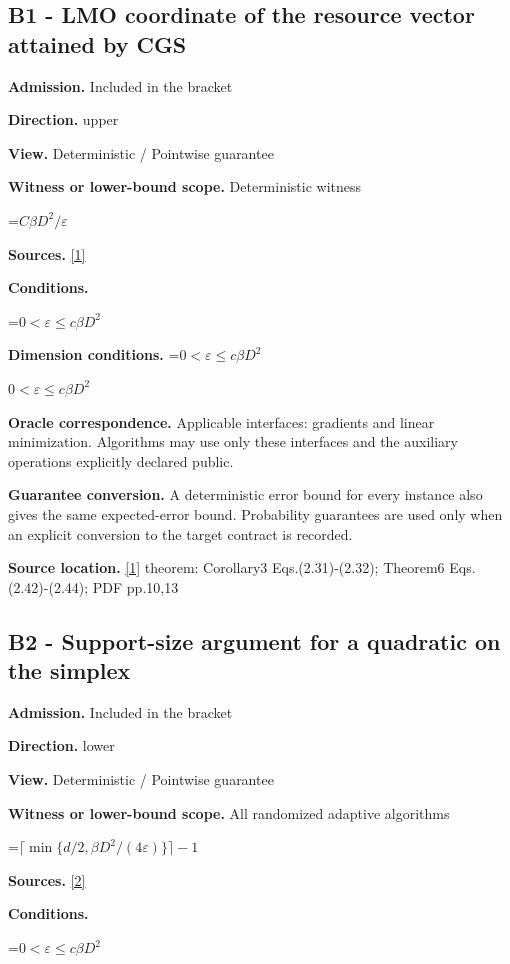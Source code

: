 \documentclass[10pt,a4paper]{article}
\newcommand{\AtlasMath}[1]{\par\begingroup\centering\setbox0=\hbox{$\displaystyle #1$}\ifdim\wd0>1.4\linewidth\typeout{ATLAS WIDE FORMULA: \the\wd0}\fi\ifdim\wd0>\linewidth\resizebox{\linewidth}{!}{\box0}\else\box0\fi\par\endgroup}
\newcommand{\AtlasInlineMath}[1]{\begingroup\setbox0=\hbox{$#1$}\ifdim\wd0>.4\linewidth\endgroup\AtlasMath{#1}\else\endgroup$#1$\fi}
\begin{document}
\subsection{B1 - LMO coordinate of the resource vector attained by CGS}
\textbf{Admission.} Included in the bracket

\textbf{Direction.} upper

\textbf{View.} Deterministic / Pointwise guarantee

\textbf{Witness or lower-bound scope.} Deterministic witness

\AtlasMath{C\beta D^2/\varepsilon}
\textbf{Sources.} \href{https://optimization-online.org/wp-content/uploads/2014/10/4605.pdf}{[1]}

\textbf{Conditions.} 
\AtlasMath{0<\varepsilon\le c\beta D^2}


\textbf{Dimension conditions.} \AtlasInlineMath{0<\varepsilon\le c\beta D^2}

\textbf{Oracle correspondence.} Applicable interfaces: gradients and linear minimization. Algorithms may use only these interfaces and the auxiliary operations explicitly declared public.

\textbf{Guarantee conversion.} A deterministic error bound for every instance also gives the same expected-error bound. Probability guarantees are used only when an explicit conversion to the target contract is recorded.

\textbf{Source location.} \href{https://optimization-online.org/wp-content/uploads/2014/10/4605.pdf}{[1]} theorem: Corollary3 Eqs.(2.31)-(2.32); Theorem6 Eqs.(2.42)-(2.44); PDF pp.10,13

\subsection{B2 - Support-size argument for a quadratic on the simplex}
\textbf{Admission.} Included in the bracket

\textbf{Direction.} lower

\textbf{View.} Deterministic / Pointwise guarantee

\textbf{Witness or lower-bound scope.} All randomized adaptive algorithms

\AtlasMath{\lceil\min\{d/2,\beta D^2/(4\varepsilon)\}\rceil-1}
\textbf{Sources.} \href{https://arxiv.org/pdf/1309.5550}{[2]}

\textbf{Conditions.} 
\AtlasMath{0<\varepsilon\le c\beta D^2}
\end{document}
